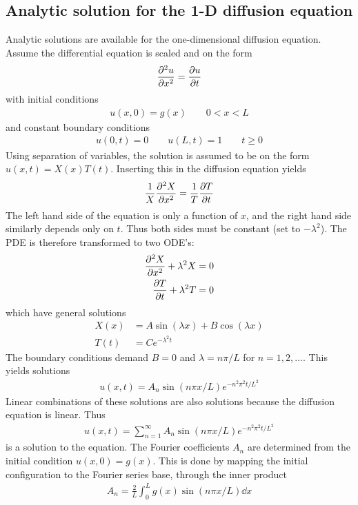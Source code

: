 \documentclass[aps,reprint]{revtex4-1}
\begin{document}
\subsection{Analytic solution for the 1-D diffusion equation} \label{sec:analytic1d}
Analytic solutions are available for the one-dimensional diffusion equation. Assume
the differential equation is scaled and on the form
\begin{align*}
  \pdv[2]{u}{x} = \pdv{u}{t}
\end{align*}
with initial conditions
\begin{align*}
  u(x,0) = g(x) \qquad 0 < x < L
\end{align*}
and constant boundary conditions
\begin{align*}
  u(0,t) = 0 \qquad u(L,t) = 1 \qquad t \geq 0
\end{align*}
Using separation of variables, the solution is assumed to be on the form
$u(x,t) = X(x)T(t)$. Inserting this in the diffusion equation yields
\begin{align*}
  \frac{1}{X} \pdv[2]{X}{x} = \frac{1}{T} \pdv{T}{t}
\end{align*}
The left hand side of the equation is only a function of $x$, and the right hand
side similarly depends only on $t$. Thus both sides must be constant (set to $-\lambda^2$).
The PDE is therefore transformed to two ODE's:
\begin{align*}
  \pdv[2]{X}{x} + \lambda^2 X &= 0 \\
  \pdv{T}{t}    + \lambda^2 T &= 0
\end{align*}
which have general solutions
\begin{align*}
  X(x) &= A\sin{(\lambda x)} + B\cos{(\lambda x)} \\
  T(t) &= Ce^{-\lambda^2 t}
\end{align*}
The boundary conditions demand $B = 0$ and $\lambda = n \pi /L$ for $n = 1,2,\hdots$.
This yields solutions
\begin{align*}
  u(x,t) = A_n \sin{(n\pi x/L)}e^{-n^2 \pi^2 t/ L^2}
\end{align*}
Linear combinations of these solutions are also solutions because the diffusion
equation is linear. Thus
\begin{align}
  u(x,t) = \sum_{n = 1}^{\infty} A_n \sin{(n\pi x/L)}e^{-n^2 \pi^2 t/ L^2}
\end{align}
is a solution to the equation. The Fourier coefficients $A_n$ are determined
from the initial condition $u(x,0) = g(x)$. This is done by mapping the initial
configuration to the Fourier series base, through the inner product
\begin{align*}
  A_n = \frac{2}{L}\int_0^L g(x) \sin{(n \pi x / L)} \dd{x}
\end{align*}
\end{document}
